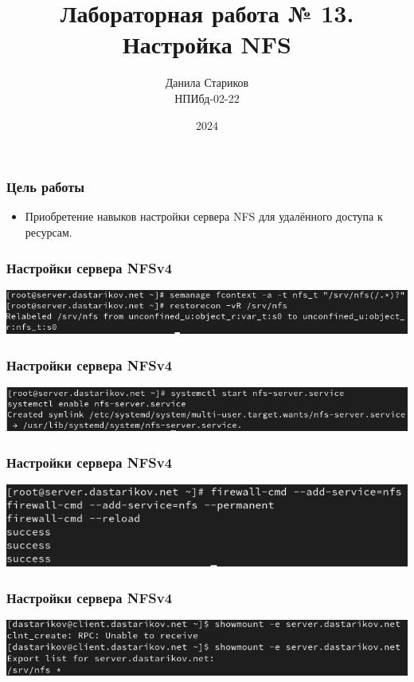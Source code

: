 

\title{Лабораторная работа № 13. \\ Настройка NFS}
\author{Данила Стариков \\ НПИбд-02-22}
\date{2024}



\frame{\titlepage}

\begin{frame}
\frametitle{Цель работы}
\begin{itemize}
    \item Приобретение навыков настройки сервера NFS для удалённого доступа к ресурсам.
\end{itemize}
\end{frame}

\begin{frame}
\frametitle{Настройки сервера NFSv4}
    \includegraphics[width=\textwidth]{../images/image01.png}
\end{frame}


\begin{frame}
\frametitle{Настройки сервера NFSv4}
    \includegraphics[width=\textwidth]{../images/image02.png}
\end{frame}


\begin{frame}
\frametitle{Настройки сервера NFSv4}
    \includegraphics[width=\textwidth]{../images/image03.png}
\end{frame}


\begin{frame}
\frametitle{Настройки сервера NFSv4}
    \includegraphics[width=\textwidth]{../images/image04.png}
\end{frame}


